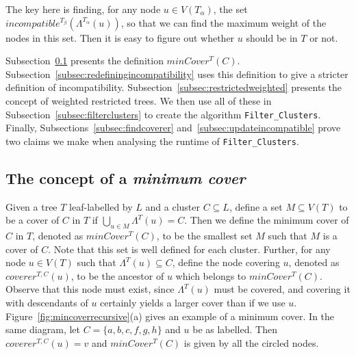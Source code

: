 \documentclass{article}
\newcommand{\leafset}{\Lambda}
\newcommand{\TA}{T_\alpha}
\newcommand{\TB}{T_\beta}
\begin{document}
    The key here is finding, for any node $u \in V(\TA)$, the set $incompatible^{\TB}(\leafset^{\TA}(u))$, so that we can find the maximum weight of the nodes in this set. Then it is easy to figure out whether $u$ should be in $T$ or not.

    Subsection~\ref{subsec:mincover} presents the definition $minCover^{T}(C)$. Subsection~\ref{subsec:redefiningincompatibility} uses this definition to give a stricter definition of incompatibility. Subsection~\ref{subsec:restrictedweighted} presents the concept of weighted restricted trees. We then use all of these in Subsection~\ref{subsec:filterclusters} to create the algorithm \texttt{Filter\_Clusters}. Finally, Subsections~\ref{subsec:findcoverer} and~\ref{subsec:updateincompatible} prove two claims we make when analysing the runtime of \texttt{Filter\_Clusters}.

    \subsection{The concept of a \textit{minimum cover}}
    \label{subsec:mincover}

    Given a tree $T$ leaf-labelled by $L$ and a cluster $C \subseteq L$, define a set $M \subseteq V(T)$ to be a cover of $C$ in $T$ if $\bigcup_{u \in M} \leafset^{T}(u) = C$. Then we define the minimum cover of $C$ in $T$, denoted as $minCover^{T}(C)$, to be the smallest set $M$ such that $M$ is a cover of $C$. Note that this set is well defined for each cluster. Further, for any node $u \in V(T)$ such that $\leafset^{T}(u) \subseteq C$, define the node covering $u$, denoted as $coverer^{T, C}(u)$, to be the ancestor of $u$ which belongs to $minCover^{T}(C)$. Observe that this node must exist, since $\leafset^{T}(u)$ must be covered, and covering it with descendants of $u$ certainly yields a larger cover than if we use $u$. Figure~\ref{fig:mincoverrecursive}(a) gives an example of a minimum cover. In the same diagram, let $C = \{a, b, c, f, g, h\}$ and $u$ be as labelled. Then $coverer^{T, C}(u) = v$ and $minCover^{T}(C)$ is given by all the circled nodes.
\end{document}
